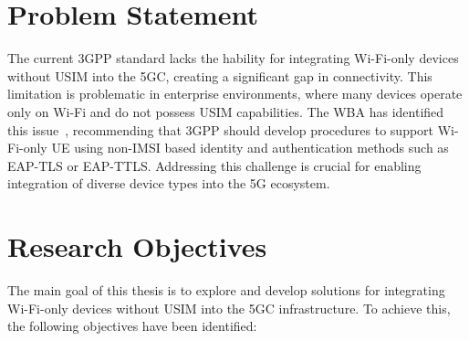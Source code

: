 \section{Problem Statement}

The current \ac{3GPP} standard lacks the hability for integrating Wi-Fi-only devices without \ac{USIM} into the \ac{5GC}, creating a significant gap in connectivity. This limitation is problematic in enterprise environments, where many devices operate only on Wi-Fi and do not possess \ac{USIM} capabilities. The \ac{WBA} has identified this issue~\cite{wba-04-2021-p59}, recommending that \ac{3GPP} should develop procedures to support Wi-Fi-only \ac{UE} using non-\acs{IMSI} based identity and authentication methods such as \ac{EAP-TLS} or \ac{EAP-TTLS}. Addressing this challenge is crucial for enabling integration of diverse device types into the \ac{5G} ecosystem.

\section{Research Objectives}

The main goal of this thesis is to explore and develop solutions for integrating Wi-Fi-only devices without \ac{USIM} into the \ac{5GC} infrastructure. To achieve this, the following objectives have been identified:


